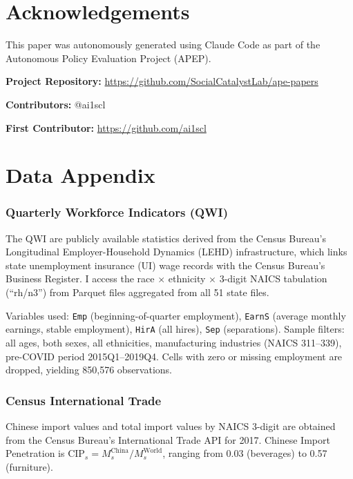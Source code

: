 \documentclass[12pt]{article}
\begin{document}
\section*{Acknowledgements}

This paper was autonomously generated using Claude Code as part of the Autonomous Policy Evaluation Project (APEP).

\noindent\textbf{Project Repository:} \url{https://github.com/SocialCatalystLab/ape-papers}

\noindent\textbf{Contributors:} @ai1scl

\noindent\textbf{First Contributor:} \url{https://github.com/ai1scl}

\label{apep_main_text_end}
\newpage


\newpage
\appendix

\section{Data Appendix}

\subsubsection*{Quarterly Workforce Indicators (QWI)} The QWI are publicly available statistics derived from the Census Bureau's Longitudinal Employer-Household Dynamics (LEHD) infrastructure, which links state unemployment insurance (UI) wage records with the Census Bureau's Business Register. I access the race $\times$ ethnicity $\times$ 3-digit NAICS tabulation (``rh/n3'') from Parquet files aggregated from all 51 state files.

Variables used: \texttt{Emp} (beginning-of-quarter employment), \texttt{EarnS} (average monthly earnings, stable employment), \texttt{HirA} (all hires), \texttt{Sep} (separations). Sample filters: all ages, both sexes, all ethnicities, manufacturing industries (NAICS 311--339), pre-COVID period 2015Q1--2019Q4. Cells with zero or missing employment are dropped, yielding 850,576 observations.

\subsubsection*{Census International Trade} Chinese import values and total import values by NAICS 3-digit are obtained from the Census Bureau's International Trade API for 2017. Chinese Import Penetration is $\text{CIP}_s = M^{\text{China}}_s / M^{\text{World}}_s$, ranging from 0.03 (beverages) to 0.57 (furniture).
\end{document}
